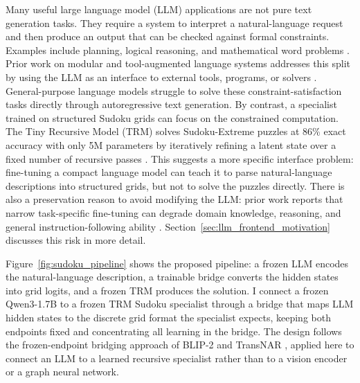 \documentclass[11pt]{article}
\begin{document}
Many useful large language model (LLM) applications are not pure text generation tasks.
They require a system to interpret a natural-language request and then produce an output that can be checked against formal constraints.
Examples include planning, logical reasoning, and mathematical word problems \cite{gaoPALProgramaidedLanguage2023,panLogicLMEmpoweringLarge2023,kambhampatiLLMsCantPlan2024}.
Prior work on modular and tool-augmented language systems addresses this split by using the LLM as an interface to external tools, programs, or solvers \cite{karpasMRKLSystemsModular2022,parisiTALMToolAugmented2022,gaoPALProgramaidedLanguage2023,panLogicLMEmpoweringLarge2023}.
General-purpose language models struggle to solve these constraint-satisfaction tasks directly through autoregressive text generation.
By contrast, a specialist trained on structured Sudoku grids can focus on the constrained computation.
The Tiny Recursive Model (TRM) solves Sudoku-Extreme puzzles at 86\% exact accuracy with only 5M parameters by iteratively refining a latent state over a fixed number of recursive passes \cite{jolicoeur-martineauLessMoreRecursive2025}.
This suggests a more specific interface problem: fine-tuning a compact language model can teach it to parse natural-language descriptions into structured grids, but not to solve the puzzles directly.
There is also a preservation reason to avoid modifying the LLM: prior work reports that narrow task-specific fine-tuning can degrade domain knowledge, reasoning, and general instruction-following ability \cite{ghoshCloserLookLimitations2024,kalajdzievskiScalingLawsForgetting2024,luoEmpiricalStudyCatastrophic2025}. Section~\ref{sec:llm_frontend_motivation} discusses this risk in more detail.

Figure~\ref{fig:sudoku_pipeline} shows the proposed pipeline: a frozen LLM encodes the natural-language description, a trainable bridge converts the hidden states into grid logits, and a frozen TRM produces the solution.
I connect a frozen Qwen3-1.7B \cite{yangQwen3TechnicalReport2025} to a frozen TRM Sudoku specialist \cite{jolicoeur-martineauLessMoreRecursive2025} through a bridge that maps LLM hidden states to the discrete grid format the specialist expects, keeping both endpoints fixed and concentrating all learning in the bridge.
The design follows the frozen-endpoint bridging approach of BLIP-2 \cite{liBLIP2BootstrappingLanguageImage2023} and TransNAR \cite{bounsiTransformersMeetNeural2024}, applied here to connect an LLM to a learned recursive specialist rather than to a vision encoder or a graph neural network.
\end{document}
